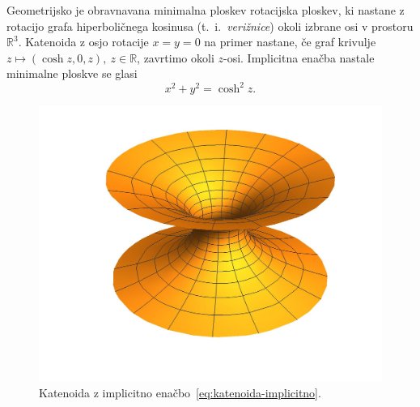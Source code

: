 \documentclass[12pt,a4paper,twoside]{article}
\theoremstyle{definition} %
\theoremstyle{plain} %
\numberwithin{equation}{section}  %
\begin{document}
Geometrijsko je obravnavana minimalna ploskev rotacijska ploskev, ki nastane z rotacijo grafa hiperboličnega kosinusa (t.~i.~\emph{verižnice}) okoli izbrane osi v prostoru $\mathbb{R}^3$. Katenoida z osjo rotacije $x=y=0$ na primer nastane, če graf krivulje $z \mapsto (\cosh z, 0, z), \ z \in \mathbb{R}$, zavrtimo okoli $z$-osi. Implicitna enačba nastale minimalne ploskve se glasi
\begin{equation} \label{eq:katenoida-implicitno}
x^2 + y^2 = \cosh ^2 z.
\end{equation}

\begin{figure}[h!]
\begin{center}
\includegraphics[scale=0.8]{images/katenoida.jpg}
\caption{Katenoida z implicitno enačbo~\eqref{eq:katenoida-implicitno}.}
\end{center}
\end{figure}
\end{document}
